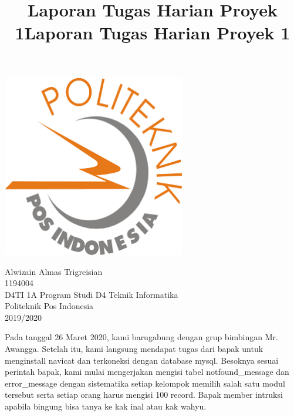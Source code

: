 \documentclass[a4paper, 12 pt]{article}
\author{}
\title{\textbf{Laporan Tugas Harian Proyek 1}\linebreak}
\date{}
\begin{document}
	\maketitle
	\begin{center}
		\includegraphics[width=8cm,height=8cm]{logo poltekpos.png}
	\end{center}
	\vspace{0.5 cm}
	
	\begin{center}
		Alwizain Almas Trigreisian \\
		1194004 \\
		D4TI 1A \linebreak
		\newline
		\newline
		\newline
		\linebreak
		\newline
		\newline
		Program Studi D4 Teknik Informatika \\
		Politeknik Pos Indonesia\\
		2019/2020\\
	\end{center}
	
	\newpage
	\begin{flushleft}
		\title{\textbf{Laporan Tugas Harian Proyek 1}}\linebreak
	\end{flushleft}

		\par Pada tanggal 26 Maret 2020, kami barugabung dengan grup bimbingan Mr. Awangga. Setelah itu, kami langsung mendapat tugas dari bapak untuk menginstall navicat dan terkoneksi dengan database mysql. Besoknya sesuai perintah bapak, kami mulai mengerjakan mengisi tabel notfound\_message dan error\_message dengan sistematika setiap kelompok memilih salah satu modul tersebut serta setiap orang harus mengisi 100 record. Bapak member intruksi apabila bingung bisa tanya ke kak inal atau kak wahyu.\\
		
\end{document}
